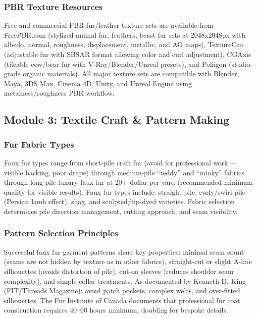 \documentclass[11pt,letterpaper]{article}
\begin{document}
\subsubsection{PBR Texture Resources}

Free and commercial PBR fur/feather texture sets are available from FreePBR.com (stylized animal fur, feathers, beast fur sets at 2048x2048px with albedo, normal, roughness, displacement, metallic, and AO maps), TextureCan (adjustable fur with SBSAR format allowing color and curl adjustment), CGAxis (tileable cow/bear fur with V-Ray/Blender/Unreal presets), and Poliigon (studio-grade organic materials). All major texture sets are compatible with Blender, Maya, 3DS Max, Cinema 4D, Unity, and Unreal Engine using metalness/roughness PBR workflow.

\subsection{Module 3: Textile Craft \& Pattern Making}

\subsubsection{Fur Fabric Types}

Faux fur types range from short-pile craft fur (avoid for professional work --- visible backing, poor drape) through medium-pile ``teddy'' and ``minky'' fabrics through long-pile luxury faux fur at 20+ dollar per yard (recommended minimum quality for visible results). Faux fur types include: straight pile, curly/swirl pile (Persian lamb effect), shag, and sculpted/tip-dyed varieties. Fabric selection determines pile direction management, cutting approach, and seam visibility.

\subsubsection{Pattern Selection Principles}

Successful faux fur garment patterns share key properties: minimal seam count (seams are not hidden by texture as in other fabrics), straight-cut or slight A-line silhouettes (avoids distortion of pile), cut-on sleeves (reduces shoulder seam complexity), and simple collar treatments. As documented by Kenneth D. King (FIT/Threads Magazine): avoid patch pockets, complex welts, and over-fitted silhouettes. The Fur Institute of Canada documents that professional fur coat construction requires 40--60 hours minimum, doubling for bespoke details.
\end{document}
